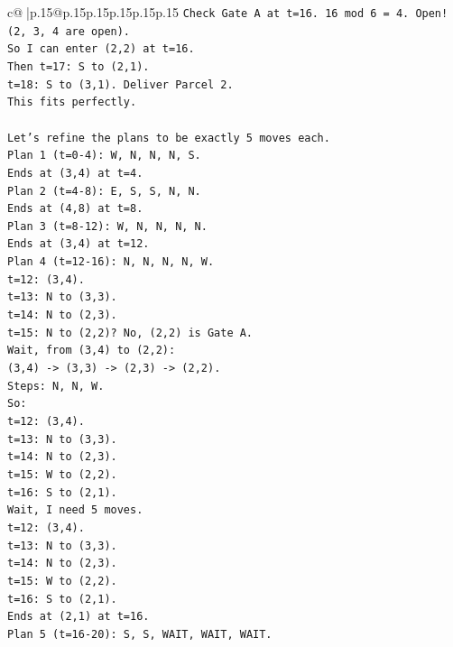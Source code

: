 \documentclass{article}
\begin{document}
{\begin{supertabular}{c@{$\;$}|p{.15\linewidth}@{}p{.15\linewidth}p{.15\linewidth}p{.15\linewidth}p{.15\linewidth}p{.15\linewidth}}
{{{\texttt{Check Gate A at t=16. 16 mod 6 = 4. Open! (2, 3, 4 are open).} \\
\texttt{So I can enter (2,2) at t=16.} \\
\texttt{Then t=17: S to (2,1).} \\
\texttt{t=18: S to (3,1). Deliver Parcel 2.} \\
\texttt{This fits perfectly.} \\
\\ 
\texttt{Let's refine the plans to be exactly 5 moves each.} \\
\texttt{Plan 1 (t=0{-}4): W, N, N, N, S.} \\
\texttt{Ends at (3,4) at t=4.} \\
\texttt{Plan 2 (t=4{-}8): E, S, S, N, N.} \\
\texttt{Ends at (4,8) at t=8.} \\
\texttt{Plan 3 (t=8{-}12): W, N, N, N, N.} \\
\texttt{Ends at (3,4) at t=12.} \\
\texttt{Plan 4 (t=12{-}16): N, N, N, N, W.} \\
\texttt{t=12: (3,4).} \\
\texttt{t=13: N to (3,3).} \\
\texttt{t=14: N to (2,3).} \\
\texttt{t=15: N to (2,2)? No, (2,2) is Gate A.} \\
\texttt{Wait, from (3,4) to (2,2):} \\
\texttt{(3,4) {-}> (3,3) {-}> (2,3) {-}> (2,2).} \\
\texttt{Steps: N, N, W.} \\
\texttt{So:} \\
\texttt{t=12: (3,4).} \\
\texttt{t=13: N to (3,3).} \\
\texttt{t=14: N to (2,3).} \\
\texttt{t=15: W to (2,2).} \\
\texttt{t=16: S to (2,1).} \\
\texttt{Wait, I need 5 moves.} \\
\texttt{t=12: (3,4).} \\
\texttt{t=13: N to (3,3).} \\
\texttt{t=14: N to (2,3).} \\
\texttt{t=15: W to (2,2).} \\
\texttt{t=16: S to (2,1).} \\
\texttt{Ends at (2,1) at t=16.} \\
\texttt{Plan 5 (t=16{-}20): S, S, WAIT, WAIT, WAIT.} \\
}}}
\end{supertabular}}
\end{document}
